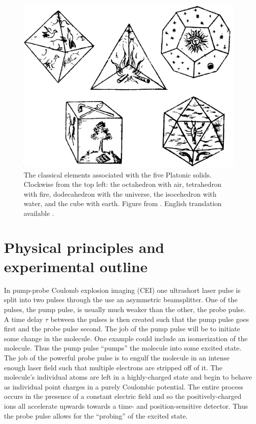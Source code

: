 \begin{figure}
  \centering
  \includegraphics[width=\textwidth]{gfx/PlatonicSolids}
  \caption[The classical elements associated with the five Platonic solids.]
  {The classical elements associated with the five Platonic solids. Clockwise from the top left: the octahedron with air, tetrahedron with fire, dodecahedron with the universe, the isocehedron with water, and the cube with earth. Figure from \citet[Book 2, p. 53]{Kepler1619}. English translation available \citep{Kepler97}.}
  \label{fig:platonicSolids}
\end{figure}

\section{Physical principles and experimental outline} \label{sec:CEIphysics}
In pump-probe Coulomb explosion imaging (CEI) one ultrashort laser pulse is split into two pulses through the use an asymmetric beamsplitter. One of the pulses, the pump pulse, is usually much weaker than the other, the probe pulse. A time delay $\tau$ between the pulses is then created such that the pump pulse goes first and the probe pulse second. The job of the pump pulse will be to initiate some change in the molecule. One example could include an isomerization of the molecule. Thus the pump pulse ``pumps'' the molecule into some excited state. The job of the powerful probe pulse is to engulf the molecule in an intense enough laser field such that multiple electrons are stripped off of it. The molecule's individual atoms are left in a highly-charged state and begin to behave as individual point charges in a purely Coulombic potential. The entire process occurs in the presence of a constant electric field and so the positively-charged ions all accelerate upwards towards a time- and position-sensitive detector. Thus the probe pulse allows for the ``probing'' of the excited state.

